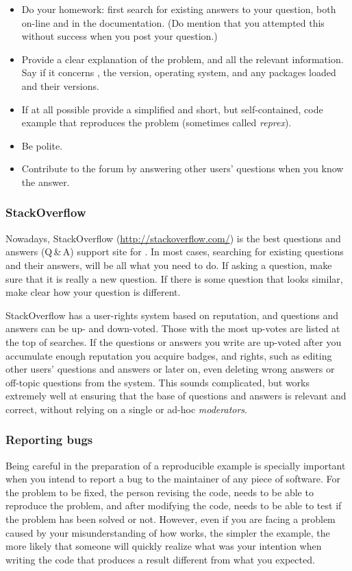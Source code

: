 \documentclass[krantz2]{krantz}\usepackage{knitr}%
\begin{document}
\begin{itemize}
  \item Do your homework: first search for existing answers to your question, both on-line and in the documentation. (Do mention that you attempted this without success when you post your question.)
  \item Provide a clear explanation of the problem, and all the relevant information. Say if it concerns \Rpgrm, the version, operating system, and any packages loaded and their versions.
  \item If at all possible provide a simplified and short, but self-contained, code example that reproduces the problem (sometimes called \emph{reprex}).
  \item Be polite.
  \item Contribute to the forum by answering other users' questions when you know the answer.
\end{itemize}

\subsubsection{StackOverflow}

Nowadays, StackOverflow (\url{http://stackoverflow.com/}) is the best questions and answers (Q\,\&\,A) support site for \Rpgrm. In most cases, searching for existing questions and their answers, will be all what you need to do. If asking a question, make sure that it is really a new question. If there is some question that looks similar, make clear how your question is different.

StackOverflow has a user-rights system based on reputation, and questions and answers can be up- and down-voted. Those with the most up-votes are listed at the top of searches. If the questions or answers you write are up-voted after you accumulate enough reputation you acquire badges, and rights, such as editing other users' questions and answers or later on, even deleting wrong answers or off-topic questions from the system. This sounds complicated, but works extremely well at ensuring that the base of questions and answers is relevant and correct, without relying on a single or ad-hoc \emph{moderators}.

\subsubsection{Reporting bugs}

Being careful in the preparation of a reproducible example is specially important when you intend to report a bug to the maintainer of any piece of software. For the problem to be fixed, the person revising the code, needs to be able to reproduce the problem, and after modifying the code, needs to be able to test if the problem has been solved or not. However, even if you are facing a problem caused by your misunderstanding of how \Rlang works, the simpler the example, the more likely that someone will quickly realize what was your intention when writing the code that produces a result different from what you expected.
\end{document}
